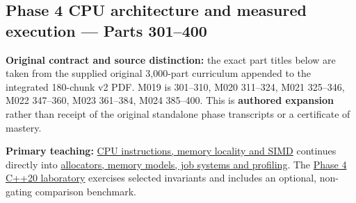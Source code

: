 \subsection{Phase 4 CPU architecture and measured execution --- Parts 301--400}\label{phase-4-cpu-architecture-and-measured-execution-parts-301400}

\textbf{Original contract and source distinction:} the exact part titles below are taken from the supplied original 3,000-part curriculum appended to the integrated 180-chunk v2 PDF. M019 is 301--310, M020 311--324, M021 325--346, M022 347--360, M023 361--384, M024 385--400. This is \textbf{authored expansion} rather than receipt of the original standalone phase transcripts or a certificate of mastery.

\textbf{Primary teaching:} \href{Continuous\%20Notes/Computing\%20Foundations\%20-\%20From\%20Bits\%20to\%20C++\%20and\%20Systems\%20APIs\#From\%20a\%20correct\%20C++\%20asset\%20service\%20to\%20the\%20instructions\%20a\%20CPU\%20can\%20execute\%20—\%20Phase\%204,\%20M019–M021,\%20Parts\%20301–346}{CPU instructions, memory locality and SIMD} continues directly into \href{Continuous\%20Notes/Computing\%20Foundations\%20-\%20From\%20Bits\%20to\%20C++\%20and\%20Systems\%20APIs\#From\%20temporary\%20memory\%20to\%20finished\%20parallel\%20frames\%20—\%20Phase\%204,\%20M022–M024,\%20Parts\%20347–400}{allocators, memory models, job systems and profiling}. The \href{tools/labs/phase4_cpu_systems_lab.cpp}{Phase 4 C++20 laboratory} exercises selected invariants and includes an optional, non-gating comparison benchmark.

